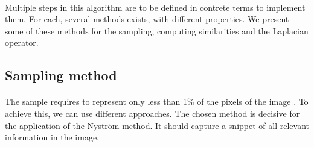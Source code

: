 \paragraph{}
Multiple steps in this algorithm are to be defined in contrete terms to implement them.
For each, several methods exists, with different properties.
We present some of these methods for the sampling, computing similarities and the Laplacian operator.

\subsection{Sampling method}

\paragraph{}
The sample requires to represent only less than 1\% of the pixels of the image \cite{fowlkes_spectral_2004}.
To achieve this, we can use different approaches.
The chosen method is decisive for the application of the Nystr\"om method.
It should capture a snippet of all relevant information in the image.
